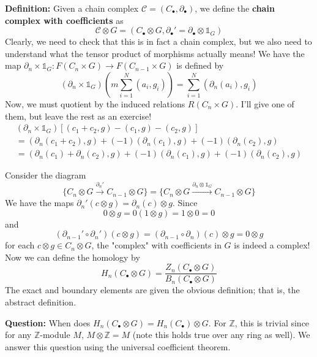 \documentclass{article}
\begin{document}
\textbf{Definition:} Given a chain complex $\mathcal{C} = (C_\bullet, \partial_\bullet)$, we define the \textbf{chain complex with coefficients} as
\[
\mathcal{C} \otimes G = (C_\bullet \otimes G, \partial_\bullet' = \partial_\bullet \otimes \mathbb{1}_G)
\]
Clearly, we need to check that this is in fact a chain complex, but we also need to understand what the tensor product of morphisms actually means! We have the map $\partial_n \times \mathbb{1}_G : F(C_n \times G) \to F(C_{n-1} \times G)$ is defined by
\[
(\partial_n \times \mathbb{1}_G) \left( m \sum_{i=1}^N(a_i,g_i) \right) = \sum_{i=1}^N (\partial_n(a_i), g_i)
\]
Now, we must quotient by the induced relations $R(C_n \times G)$. I'll give one of them, but leave the rest as an exercise!
\begin{align*}
(\partial_n \times \mathbb{1}_G)[(c_1 + c_2, g) - (c_1,g) - (c_2,g)] \\ = (\partial_n(c_1 + c_2), g) + (-1)(\partial_n(c_1), g) + (-1)(\partial_n(c_2), g) \\
=  (\partial_n(c_1) + \partial_n(c_2), g) + (-1)(\partial_n(c_1), g) + (-1)(\partial_n(c_2), g)
\end{align*}

Consider the diagram 
\[
\{C_n \otimes G \xrightarrow{\partial_n'} C_{n-1}\otimes G\} = \{ C_n \otimes G \xrightarrow{\partial_n \otimes \mathbb{1}_G} C_{n-1}\otimes G \}
\]
We have the maps $\partial_n'(c \otimes g) = \partial_n(c) \otimes g$. Since 
\[
0 \otimes g = 0 (1 \otimes g) = 1 \otimes 0 = 0
\]
and 
\[
(\partial_{n-1}'\circ \partial_{n}')(c \otimes g) = (\partial_{n-1}\circ \partial_{n})(c) \otimes g = 0 \otimes g
\]
for each $c \otimes g \in C_n \otimes G$, the "complex" with coefficients in $G$ is indeed a complex! Now we can define the homology by
\[
H_n(C_\bullet \otimes G) = \frac{Z_n(C_\bullet \otimes G)}{B_n(C_\bullet \otimes G)}
\]
The exact and boundary elements are given the obvious definition; that is, the abstract definition.

\textbf{Question:} When does $H_n(C_\bullet \otimes G) = H_n(C_\bullet) \otimes G$. For $\mathbb{Z}$, this is trivial since for any $\mathbb{Z}$-module $M$, $M \otimes \mathbb{Z} = M$ (note this holds true over any ring as well). We answer this question using the universal coefficient theorem.
\end{document}
